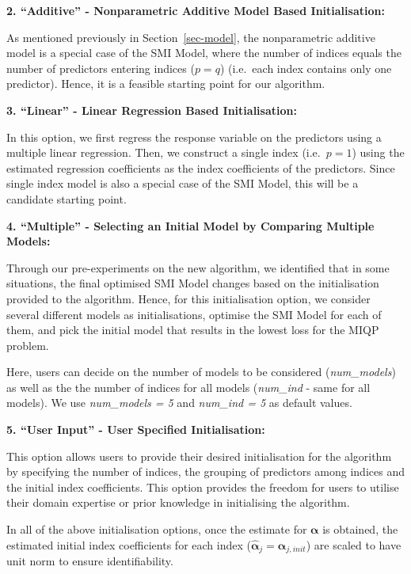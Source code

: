 \documentclass[11pt,a4paper,]{article}
\begin{document}
\textbf{2. ``Additive'' - Nonparametric Additive Model Based
Initialisation:}

As mentioned previously in Section~\ref{sec-model}, the nonparametric
additive model is a special case of the SMI Model, where the number of
indices equals the number of predictors entering indices (\(p = q\))
(i.e.~each index contains only one predictor). Hence, it is a feasible
starting point for our algorithm.

\textbf{3. ``Linear'' - Linear Regression Based Initialisation:}

In this option, we first regress the response variable on the predictors
using a multiple linear regression. Then, we construct a single index
(i.e.~\(p = 1\)) using the estimated regression coefficients as the
index coefficients of the predictors. Since single index model is also a
special case of the SMI Model, this will be a candidate starting point.

\textbf{4. ``Multiple'' - Selecting an Initial Model by Comparing
Multiple Models:}

Through our pre-experiments on the new algorithm, we identified that in
some situations, the final optimised SMI Model changes based on the
initialisation provided to the algorithm. Hence, for this initialisation
option, we consider several different models as initialisations,
optimise the SMI Model for each of them, and pick the initial model that
results in the lowest loss for the MIQP problem.

Here, users can decide on the number of models to be considered
(\emph{num\_models}) as well as the the number of indices for all models
(\emph{num\_ind} - same for all models). We use \emph{num\_models = 5}
and \emph{num\_ind = 5} as default values.

\textbf{5. ``User Input'' - User Specified Initialisation:}

This option allows users to provide their desired initialisation for the
algorithm by specifying the number of indices, the grouping of
predictors among indices and the initial index coefficients. This option
provides the freedom for users to utilise their domain expertise or
prior knowledge in initialising the algorithm.

In all of the above initialisation options, once the estimate for
\(\bm{\alpha}\) is obtained, the estimated initial index coefficients
for each index (\(\hat{\bm{\alpha}}_{j} = \bm{\alpha}_{j, init}\)) are
scaled to have unit norm to ensure identifiability.
\end{document}
